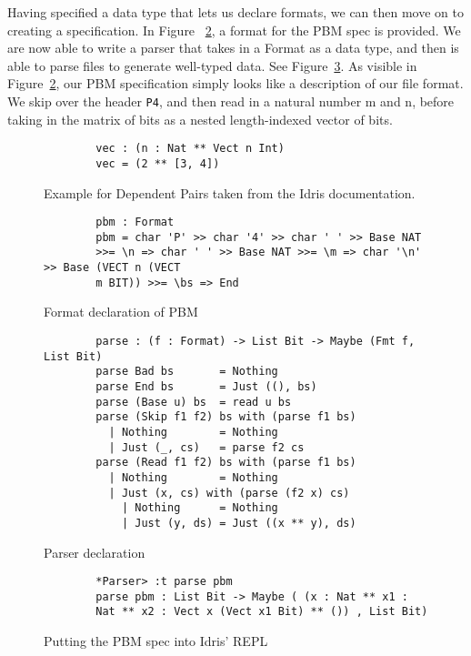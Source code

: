 Having specified a data type that lets us declare formats, we can then move on
to creating a specification. In Figure ~\ref{spec_declaration}, a format for the
PBM spec is provided. We are now able to write a parser that takes in a Format
as a data type, and then is able to parse files to generate well-typed data. See
Figure~\ref{parser}. As visible in Figure~\ref{spec_declaration}, our PBM
specification simply looks like a description of our file format. We skip over
the header \texttt{P4}, and then read in a natural number m and n, before taking
in the matrix of bits as a nested length-indexed vector of bits. 

\begin{figure}[h]
    \caption{Example for Dependent Pairs taken from the Idris documentation.}
    \label{dependentPairExample}
    \begin{lstlisting}
        vec : (n : Nat ** Vect n Int)
        vec = (2 ** [3, 4])
    \end{lstlisting}
\end{figure}

\begin{figure}[h]
    \caption{Format declaration of PBM \protect\cite{power_of_pi}}
    \label{spec_declaration}
    \begin{lstlisting}
        pbm : Format 
        pbm = char 'P' >> char '4' >> char ' ' >> Base NAT
        >>= \n => char ' ' >> Base NAT >>= \m => char '\n' >> Base (VECT n (VECT
        m BIT)) >>= \bs => End
    \end{lstlisting}
\end{figure}


\begin{figure}[ht!!!!!]
    \caption{Parser declaration \protect\cite{power_of_pi}}
    \label{parser}
    \begin{lstlisting}
        parse : (f : Format) -> List Bit -> Maybe (Fmt f, List Bit)
        parse Bad bs       = Nothing
        parse End bs       = Just ((), bs)
        parse (Base u) bs  = read u bs
        parse (Skip f1 f2) bs with (parse f1 bs)
          | Nothing        = Nothing
          | Just (_, cs)   = parse f2 cs
        parse (Read f1 f2) bs with (parse f1 bs)
          | Nothing        = Nothing
          | Just (x, cs) with (parse (f2 x) cs)
            | Nothing      = Nothing
            | Just (y, ds) = Just ((x ** y), ds)
    \end{lstlisting}
\end{figure}

\begin{figure}[ht]
    \caption{Putting the PBM spec into Idris' REPL}
    \label{repl}
    \begin{lstlisting}
        *Parser> :t parse pbm 
        parse pbm : List Bit -> Maybe ( (x : Nat ** x1 :
        Nat ** x2 : Vect x (Vect x1 Bit) ** ()) , List Bit)
    \end{lstlisting}
\end{figure}

